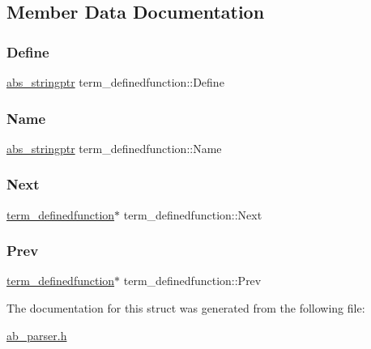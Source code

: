 \subsection{Member Data Documentation}
\mbox{\label{structterm__definedfunction_aa78ae899d76ca4b6baf02f8150a0ed24}} 
\subsubsection{\texorpdfstring{Define}{Define}}
{\footnotesize\ttfamily \hyperlink{structabs__stringptr}{abs\+\_\+stringptr} term\+\_\+definedfunction\+::\+Define}

\mbox{\label{structterm__definedfunction_af6b99d4f43bb09f5d3340448e0daa489}} 
\subsubsection{\texorpdfstring{Name}{Name}}
{\footnotesize\ttfamily \hyperlink{structabs__stringptr}{abs\+\_\+stringptr} term\+\_\+definedfunction\+::\+Name}

\mbox{\label{structterm__definedfunction_ae4d62f23998fa05c8b5e4e900980460c}} 
\subsubsection{\texorpdfstring{Next}{Next}}
{\footnotesize\ttfamily \hyperlink{structterm__definedfunction}{term\+\_\+definedfunction}$\ast$ term\+\_\+definedfunction\+::\+Next}

\mbox{\label{structterm__definedfunction_a8f3ed1e8ae1fa3012452929ca8cb0da3}} 
\subsubsection{\texorpdfstring{Prev}{Prev}}
{\footnotesize\ttfamily \hyperlink{structterm__definedfunction}{term\+\_\+definedfunction}$\ast$ term\+\_\+definedfunction\+::\+Prev}



The documentation for this struct was generated from the following file\+:\begin{DoxyCompactItemize}
\item 
\hyperlink{ab__parser_8h}{ab\+\_\+parser.\+h}\end{DoxyCompactItemize}
